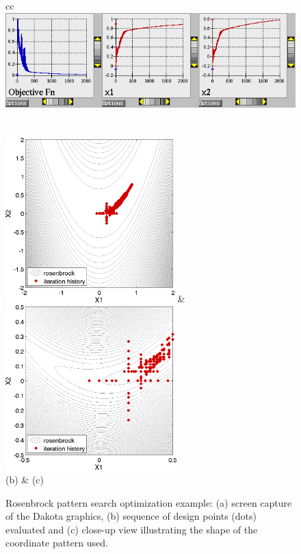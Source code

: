 \begin{figure}[ht!]
  \centering
  \begin{tabular}{cc}
	      {\includegraphics[width=\textwidth]{images/dak_graphics_ps_opt}}\\
  \\
  \qquad\\
  \includegraphics[height=2.5in]{images/rosen_ps_opt_pts} &
  \includegraphics[height=2.5in]{images/rosen_ps_opt_pts2} \\
  (b) & (c)
  \end{tabular}
  \caption{Rosenbrock pattern search optimization example: (a) screen
    capture of the Dakota graphics, (b) sequence of design points
    (dots) evaluated and (c) close-up view illustrating the shape of
    the coordinate pattern used. }
  \label{opt:methods:gradientfree:local:example:ps_graphics}
\end{figure}

